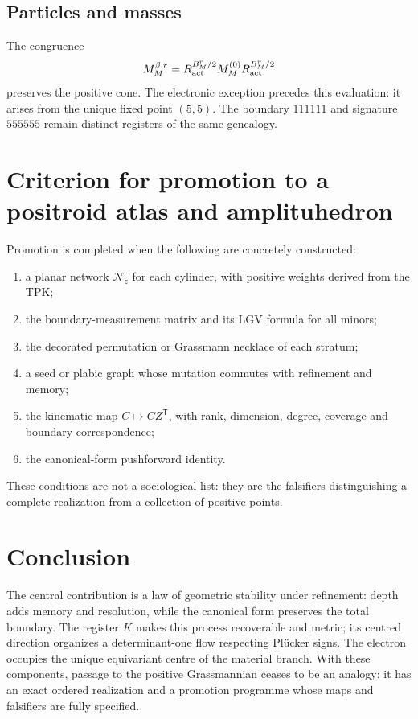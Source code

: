 \subsection{Particles and masses}

The congruence
\[
M_M^{\beta,r}
=R_{\rm act}^{B_M^r/2}M_M^{(0)}R_{\rm act}^{B_M^r/2}
\]
preserves the positive cone. The electronic exception precedes this evaluation: it arises from the unique fixed point \((5,5)\). The boundary \(111111\) and signature \(555555\) remain distinct registers of the same genealogy.

\section{Criterion for promotion to a positroid atlas and amplituhedron}

Promotion is completed when the following are concretely constructed:
\begin{enumerate}
\item a planar network \(\mathcal N_z\) for each cylinder, with positive weights derived from the TPK;
\item the boundary-measurement matrix and its LGV formula for all minors;
\item the decorated permutation or Grassmann necklace of each stratum;
\item a seed or plabic graph whose mutation commutes with refinement and memory;
\item the kinematic map \(C\mapsto CZ^{\mathsf T}\), with rank, dimension, degree, coverage and boundary correspondence;
\item the canonical-form pushforward identity.
\end{enumerate}
These conditions are not a sociological list: they are the falsifiers distinguishing a complete realization from a collection of positive points.

\section{Conclusion}

The central contribution is a law of geometric stability under refinement: depth adds memory and resolution, while the canonical form preserves the total boundary. The register \(K\) makes this process recoverable and metric; its centred direction organizes a determinant-one flow respecting Plücker signs. The electron occupies the unique equivariant centre of the material branch. With these components, passage to the positive Grassmannian ceases to be an analogy: it has an exact ordered realization and a promotion programme whose maps and falsifiers are fully specified.

